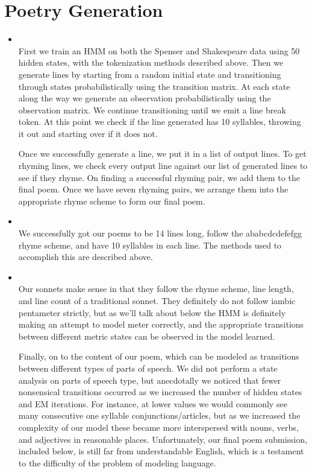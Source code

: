 \section{Poetry Generation}
\medskip
\begin{itemize}



    \item {} \\
    First we train an HMM on both the Spenser and Shakespeare data using 50
    hidden states, with the tokenization methods described above. Then we generate
    lines by starting from a random initial state and transitioning through states
    probabilistically using the transition matrix. At each state along the way we
    generate an observation probabilistically using the observation matrix. We
    continue transitioning until we emit a line break token. At this point
    we check if the line generated has 10 syllables, throwing it out and starting
    over if it does not.

    Once we successfully generate a line, we put it in a list of output lines.
    To get rhyming lines, we check every output line against our list of generated
    lines to see if they rhyme. On finding a successful rhyming pair, we add them
    to the final poem. Once we have seven rhyming pairs, we arrange them into the
    appropriate rhyme scheme to form our final poem.

    \item {} \\
    We successfully got our poems to be 14 lines long, follow the ababcdcdefefgg
    rhyme scheme, and have 10 syllables in each line. The methods used to accomplish
    this are described above.

    \item {} \\
    Our sonnets make sense in that they follow the rhyme scheme, line length,
    and line count of a traditional sonnet. They definitely do not follow
    iambic pentameter strictly, but as we'll talk about below the HMM is definitely
    making an attempt to model meter correctly, and the appropriate transitions
    between different metric states can be observed in the model learned.

    Finally, on to the content of our poem, which can be modeled as transitions
    between different types of parts of speech. We did not perform a state analysis
    on parts of speech type, but anecdotally we noticed that fewer nonsensical
    transitions occurred as we increased the number of hidden states and EM
    iterations. For instance, at lower values we would commonly see many
    consecutive one syllable conjunctions/articles, but as we increased the complexity of
    our model these became more interspersed with nouns, verbs, and adjectives
    in reasonable places. Unfortunately, our final poem submission, included
    below, is still far from understandable English, which is a testament to
    the difficulty of the problem of modeling language.


\end{itemize}
